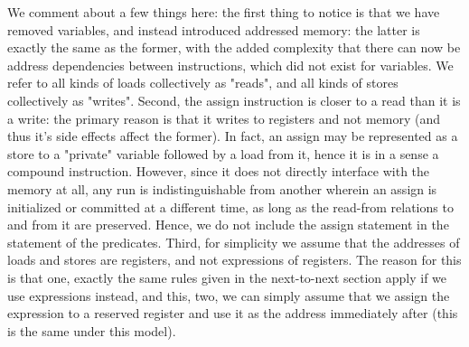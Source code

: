 \documentclass{article}
\begin{document}
We comment about a few things here: the first thing to notice is that we have removed variables, and instead introduced addressed memory: the latter is exactly the same as the former, with the added complexity that there can now be address dependencies between instructions, which did not exist for variables. We refer to all kinds of loads collectively as "reads", and all kinds of stores collectively as "writes". Second, the assign instruction is closer to a read than it is a write: the primary reason is that it writes to registers and not memory (and thus it's side effects affect the former). In fact, an assign may be represented as a store to a "private" variable followed by a load from it, hence it is in a sense a compound instruction. However, since it does not directly interface with the memory at all, any run is indistinguishable from another wherein an assign is initialized or committed at a different time, as long as the read-from relations to and from it are preserved. Hence, we do not include the assign statement in the statement of the predicates. Third, for simplicity we assume that the addresses of loads and stores are registers, and not expressions of registers. The reason for this is that one, exactly the same rules given in the next-to-next section apply if we use expressions instead, and this, two, we can simply assume that we assign the expression to a reserved register and use it as the address immediately after (this is the same under this model). 
\end{document}
